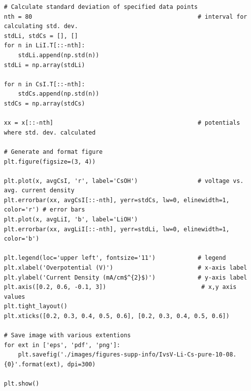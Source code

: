\documentclass[journal=jpccck,manuscript=suppinfo,email=true]{achemso}
\begin{document}
\begin{verbatim}
# Calculate standard deviation of specified data points
nth = 80                                               # interval for calculating std. dev.
stdLi, stdCs = [], []
for n in LiI.T[::-nth]:
    stdLi.append(np.std(n))
stdLi = np.array(stdLi)

for n in CsI.T[::-nth]:
    stdCs.append(np.std(n))
stdCs = np.array(stdCs)

xx = x[::-nth]                                         # potentials where std. dev. calculated

# Generate and format figure
plt.figure(figsize=(3, 4))

plt.plot(x, avgCsI, 'r', label='CsOH')                 # voltage vs. avg. current density
plt.errorbar(xx, avgCsI[::-nth], yerr=stdCs, lw=0, elinewidth=1, color='r') # error bars
plt.plot(x, avgLiI, 'b', label='LiOH')
plt.errorbar(xx, avgLiI[::-nth], yerr=stdLi, lw=0, elinewidth=1, color='b')

plt.legend(loc='upper left', fontsize='11')            # legend
plt.xlabel('Overpotential (V)')                        # x-axis label
plt.ylabel('Current Density (mA/cm$^{2}$)')            # y-axis label
plt.axis([0.2, 0.6, -0.1, 3])                           # x,y axis values
plt.tight_layout()
plt.xticks([0.2, 0.3, 0.4, 0.5, 0.6], [0.2, 0.3, 0.4, 0.5, 0.6])

# Save image with various extentions
for ext in ['eps', 'pdf', 'png']:
    plt.savefig('./images/figures-supp-info/IvsV-Li-Cs-pure-10-08.{0}'.format(ext), dpi=300)

plt.show()
\end{verbatim}
\end{document}
